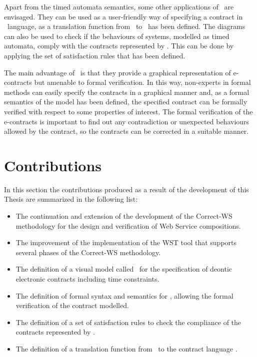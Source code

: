 Apart from the timed automata semantics, some other applications of \codiag\ are envisaged. They can be used as a user-friendly way of specifying a contract in \CL\ language, as a translation function from \codiag\ to \CL\ has been defined. The diagrams can also be used to check if the behaviours of systems, modelled as timed automata, comply with the contracts represented by \codiag. This can be done by applying the set of satisfaction rules that has been defined.

The main advantage of \codiag\ is that they provide a graphical representation of e-contracts but amenable to formal verification. In this way, non-experts in formal methods can easily specify the contracts in a graphical manner and, as a formal semantics of the model has been defined, the specified contract can be formally verified with respect to some properties of interest. The formal verification of the e-contracts is important to find out any contradiction or unexpected behaviours allowed by the contract, so the contracts can be corrected in a suitable manner.

\section{Contributions}\label{contributions}

In this section the contributions produced as a result of the development of this Thesis are summarized in the following list:

\begin{itemize}

\item The continuation and extension of the development of the Correct-WS methodology for the design and verification of Web Service compositions.

\item The improvement of the implementation of the WST tool that supports several phases of the Correct-WS methodology.

\item The definition of a visual model called \codiag\ for the specification of deontic electronic contracts including time constraints.

\item The definition of formal syntax and semantics for \codiag, allowing the formal verification of the contract modelled.

\item The definition of a set of satisfaction rules to check the compliance of the contracts represented by \codiag.

\item The definition of a translation function from \codiag\ to the contract language \CL.

\end{itemize}

